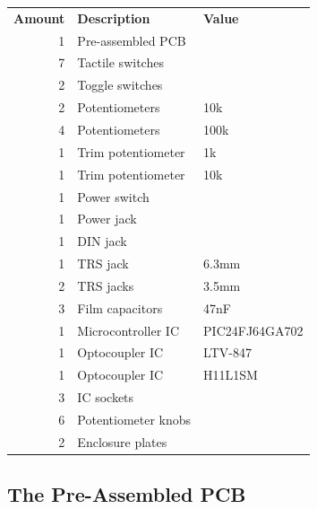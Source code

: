\documentclass{scrartcl}
\begin{document}
\begin{center}
    \begin{tabular}{|r|l|l|}
        \hline
        \textbf{Amount} & \textbf{Description} & \textbf{Value} \\
        1               & Pre-assembled PCB    &                \\
        7               & Tactile switches     &                \\
        2               & Toggle switches      &                \\
        2               & Potentiometers       & 10k            \\
        4               & Potentiometers       & 100k           \\
        1               & Trim potentiometer   & 1k             \\
        1               & Trim potentiometer   & 10k            \\
        1               & Power switch         &                \\
        1               & Power jack           &                \\
        1               & DIN jack             &                \\
        1               & TRS jack             & 6.3mm          \\
        2               & TRS jacks            & 3.5mm          \\
        3               & Film capacitors      & 47nF           \\
        1               & Microcontroller IC   & PIC24FJ64GA702 \\
        1               & Optocoupler IC       & LTV-847        \\
        1               & Optocoupler IC       & H11L1SM        \\
        3               & IC sockets           &                \\
        6               & Potentiometer knobs  &                \\
        2               & Enclosure plates     &                \\
        \hline
    \end{tabular}
\end{center}

\subsection{The Pre-Assembled PCB}
\end{document}
